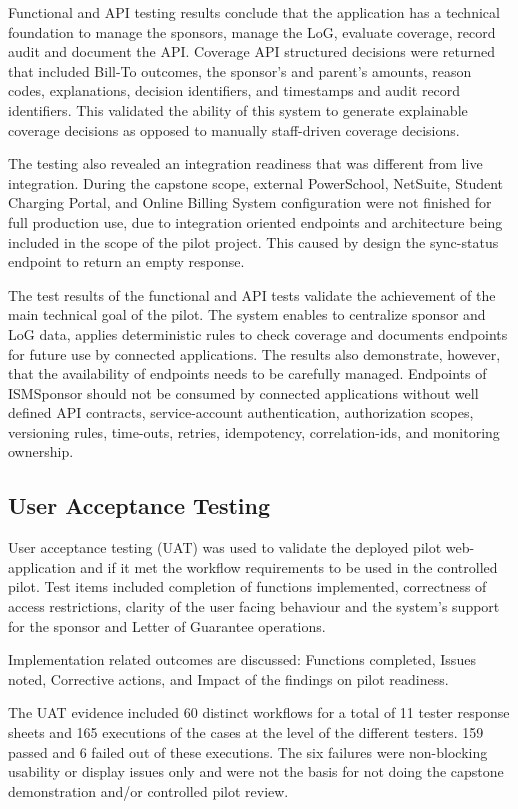 Functional and API testing results conclude that the application has a technical foundation to manage the sponsors, manage the LoG, evaluate coverage, record audit and document the API. Coverage API structured decisions were returned that included Bill-To outcomes, the sponsor's and parent's amounts, reason codes, explanations, decision identifiers, and timestamps and audit record identifiers. This validated the ability of this system to generate explainable coverage decisions as opposed to manually staff-driven coverage decisions.

The testing also revealed an integration readiness that was different from live integration. During the capstone scope, external PowerSchool, NetSuite, Student Charging Portal, and Online Billing System configuration were not finished for full production use, due to integration oriented endpoints and architecture being included in the scope of the pilot project. This caused by design the sync-status endpoint to return an empty response.

The test results of the functional and API tests validate the achievement of the main technical goal of the pilot. The system enables to centralize sponsor and LoG data, applies deterministic rules to check coverage and documents endpoints for future use by connected applications. The results also demonstrate, however, that the availability of endpoints needs to be carefully managed. Endpoints of ISMSponsor should not be consumed by connected applications without well defined API contracts, service-account authentication, authorization scopes, versioning rules, time-outs, retries, idempotency, correlation-ids, and monitoring ownership.

\subsection{User Acceptance Testing}

User acceptance testing (UAT) was used to validate the deployed pilot web-application and if it met the workflow requirements to be used in the controlled pilot. Test items included completion of functions implemented, correctness of access restrictions, clarity of the user facing behaviour and the system's support for the sponsor and Letter of Guarantee operations.

Implementation related outcomes are discussed: Functions completed, Issues noted, Corrective actions, and Impact of the findings on pilot readiness.

The UAT evidence included 60 distinct workflows for a total of 11 tester response sheets and 165 executions of the cases at the level of the different testers. 159 passed and 6 failed out of these executions. The six failures were non-blocking usability or display issues only and were not the basis for not doing the capstone demonstration and/or controlled pilot review.

